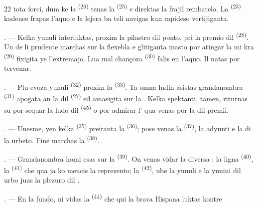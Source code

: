 \begin{VUpage}[24]{22}
\VUcontinue
tota forci, dum ke la  \textsuperscript{(26)} tenas la\nl
{} \textsuperscript{(25)} e direktas la frajil rembatelo. La\nl
{} \textsuperscript{(23)} kadence frapas l'aquo e la lejera ba\cc
teli navigas kun rapideso vertijiganta.

. --- Kelka yunuli interluktas, proxim la\nl
pilastro dil ponto, pri la premio dil \cc
{} \textsuperscript{(28)}. Un de li prudente marchas sur la\nl
flexebla e glitiganta masto por atingar la mi\cc
kra  \textsuperscript{(29)} fixigita ye l'extremajo. Lua mal\cc
chançoza  \textsuperscript{(30)} falis en l'aquo. Il\nl
natas por tervenar.

. --- Plu evoza yunuli  \textsuperscript{(32)}\nl
proxim la  \textsuperscript{(33)}. Ta omna ludin asistas\nl
grandanombra  \textsuperscript{(31)} apogata an la \cc
{} dil  \textsuperscript{(27)} ed amasigita sur la .\nl
Kelka spektanti, tamen, riturnas su por sequar\nl
la ludo dil  \textsuperscript{(45)} o por admirar\nl
l' qua venas por la \nl
dil premii.

. --- Unesme, yen kelka  \textsuperscript{(35)} preiranta\nl
la  \textsuperscript{(36)}; pose venas la  \textsuperscript{(37)}, la\nl
adyunti e la  di la urbeto.\nl
Fine marchas la  \textsuperscript{(38)}.

\VUsaut{5.0mm}
\VUsaut{3.6mm}

. --- Grandanombra homi esas sur la \cc
{} \textsuperscript{(39)}. On venas vidar la diversa  :\nl
la ligna  \textsuperscript{(40)}, la  \textsuperscript{(41)} che qua ja ko\cc
mencis la reprezento; la  \textsuperscript{(42)}, ube\nl
la yunuli e la yunini dil urbo juas la plezuro\nl
dil .

. --- En la fundo, ni vidas la  \textsuperscript{(44)} che\nl
qui la brava  Hispana luktas kontre
\parplein
\end{VUpage}

